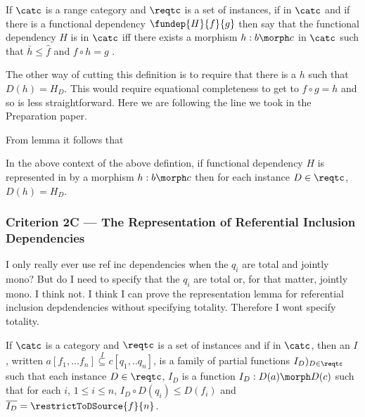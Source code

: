 \begin{definition}
If $\catc$ is a range category and $\reqtc$ is a set of instances, if
\fgsourcediag
in $\catc$ 
and if there is a functional dependency $\fundep{H}{f}{g}$ then say that 
the functional dependency $H$ is  in $\catc$ 
iff there exists a morphism $h:b \morph c$ in $\catc$ such that 
$\bar{h} \leq \widehat{f}$ and 
$f \circ h = g$  . 

\begin{rationale}
The other way of cutting this definition is to  require that there
is a $h$ such that $D(h) = H_D$. This  would
require equational completeness to get to $f \circ g =h$ and so is less straightforward. Here we are following the line we took in 
 the Preparation paper. 
\end{rationale}
\end{definition}

From lemma  it follows that

\begin{observation}
In the above context of the above defintion, if functional dependency $H$ is represented in \catcw by a morphism $h:b \morph c$ then for each instance $D \in \reqtc$, $D(h)=H_D$.
\end{observation}


\subsubsection{Criterion 2C --- The Representation of Referential Inclusion Dependencies}

\begin{rationale}
I only really ever use ref inc dependencies when the $q_i$
are total and jointly mono? But do I need to specify that the
$q_i$ are total or, for that matter, jointly mono. I think not.
I think I can prove the representation lemma for referential inclusion depdendencies without specifying totality. Therefore
I wont specify totality.
\end{rationale}
\begin{definition}
If $\catc$ is a  category and $\reqtc$ is a set of instances 
and if
\fnsourceqnsource
in $\catc$, then an  $I$, written $a[f_1,...f_n] \overset{I}{\subseteq} c[q_1,..q_n]$, 
is a family of partial functions $I_D)_{D \in \reqtc}$
such that each instance $D \in \reqtc$, 
$I_D$ is a function $I_D : D(a) \morph D(c)$ such that
for each $i$, $1 \leq i \le n$, $I_D \circ D(q_i) \leq D(f_i)$
and $\overline{I_D}=\restrictToDSource{f}{n}$.
\end{definition}

